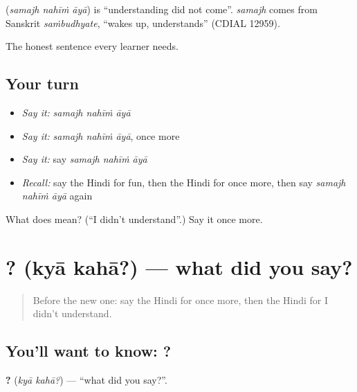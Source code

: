 \begin{cousinweb}
\textbf{  } (\emph{samajh nahīṁ āyā}) is \textquotedblleft{}understanding did not come\textquotedblright{}. \emph{samajh} comes from Sanskrit \emph{saṁbudhyate}, \textquotedblleft{}wakes up, understands\textquotedblright{} (CDIAL 12959).
\end{cousinweb}

\begin{grammarlens}[title={What you've built}]
The honest sentence every learner needs.
\end{grammarlens}

\subsection*{Your turn}
\begin{itemize}
\raggedright
  \item \emph{Say it:} \emph{samajh nahīṁ āyā}
  \item \emph{Say it:} \emph{samajh nahīṁ āyā}, once more
  \item \emph{Say it:} say \emph{samajh nahīṁ āyā}
  \item \emph{Recall:} say the Hindi for fun, then the Hindi for once more, then say \emph{samajh nahīṁ āyā} again
\end{itemize}

\begin{tcolorbox}[breakable,colback=teal!4,colframe=teal!35!black,title={Before you move on}]
What does    mean? (\textquotedblleft{}I didn't understand\textquotedblright{}.) Say it once more.
\end{tcolorbox}
\section[\texorpdfstring{\hi{क्या} \hi{कहा}? (kyā kahā?)}{क्या कहा? (kyā kahā?)}]{ ? (kyā kahā?) — what did you say?}

\label{lesson:HI-C126-kyakaha}



\begin{quote}
Before the new one: say the Hindi for once more, then the Hindi for I didn't understand.
\end{quote}

\subsection*{You'll want to know:  ?}
\textbf{ ?} (\emph{kyā kahā?}) — \textquotedblleft{}what did you say?\textquotedblright{}.

